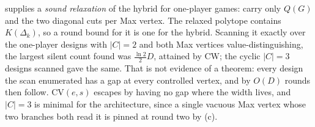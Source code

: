 \begin{remark}\label{rem:fd-cv-search}
 supplies a \emph{sound relaxation} of the hybrid for
one-player games: carry only $Q(G)$ and the two diagonal cuts per Max vertex.
The relaxed polytope contains $K(\Delta_k)$, so a round bound for it is one for
the hybrid. Scanning it exactly over the one-player designs with $|C|=2$ and
both Max vertices value-distinguishing, the largest silent count found was
$\tfrac{\ln2}{2}D$, attained by $\mathrm{CW}$; the cyclic $|C|=3$ designs
scanned gave the same. That is not evidence of a theorem: every design the scan
enumerated has a gap at every controlled vertex, and by 
$O(D)$ rounds then follow. $\mathrm{CV}(e,s)$ escapes by having no gap where
the width lives, and $|C|=3$ is minimal for the architecture, since a single
vacuous Max vertex whose two branches both read it is pinned at round two by
(c).
\end{remark}